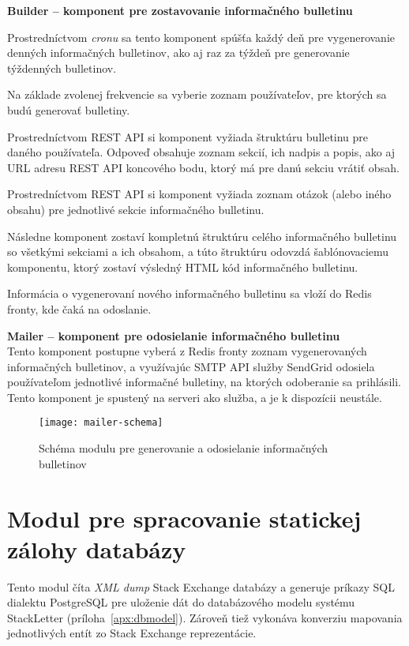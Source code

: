 \textbf{Builder -- komponent pre zostavovanie informačného bulletinu}
\begin{my_enumerate}
\item{Prostredníctvom \textit{cronu} sa tento komponent spúšťa každý deň pre vygenerovanie denných informačných bulletinov,
ako aj raz za týždeň pre generovanie týždenných bulletinov.}
\item{Na základe zvolenej frekvencie sa vyberie zoznam používateľov, pre ktorých sa budú generovať bulletiny.}
\item{Prostredníctvom REST API si komponent vyžiada štruktúru bulletinu pre daného používateľa. Odpoveď obsahuje zoznam
sekcií, ich nadpis a popis, ako aj URL adresu REST API koncového bodu, ktorý má pre danú sekciu vrátiť obsah.}
\item{Prostredníctvom REST API si komponent vyžiada zoznam otázok (alebo iného obsahu) pre jednotlivé sekcie
informačného bulletinu.}
\item{Následne komponent zostaví kompletnú štruktúru celého informačného bulletinu so všetkými sekciami a ich obsahom,
a túto štruktúru odovzdá šablónovaciemu komponentu, ktorý zostaví výsledný HTML kód informačného bulletinu.}
\item{Informácia o vygenerovaní nového informačného bulletinu sa vloží do Redis fronty, kde čaká na odoslanie.}
\end{my_enumerate}

\textbf{Mailer -- komponent pre odosielanie informačného bulletinu}\\
Tento komponent postupne vyberá z Redis fronty zoznam vygenerovaných informačných bulletinov, a využívajúc SMTP API služby
SendGrid odosiela používateľom jednotlivé informačné bulletiny, na ktorých odoberanie sa prihlásili.
Tento komponent je spustený na serveri ako služba, a je k dispozícii neustále.

\begin{figure}[H]\begin{center}
\texttt{[image: mailer-schema]}
\caption{Schéma modulu pre generovanie a odosielanie informačných bulletinov \label{fig:mailer-schema}}\end{center}
\end{figure}

\section{Modul pre spracovanie statickej zálohy databázy}

Tento modul číta \textit{XML dump} Stack Exchange databázy a generuje príkazy SQL dialektu PostgreSQL pre uloženie dát
do databázového modelu systému StackLetter (príloha~\ref{apx:dbmodel}). Zároveň tiež vykonáva konverziu mapovania jednotlivých
entít zo Stack Exchange reprezentácie.

